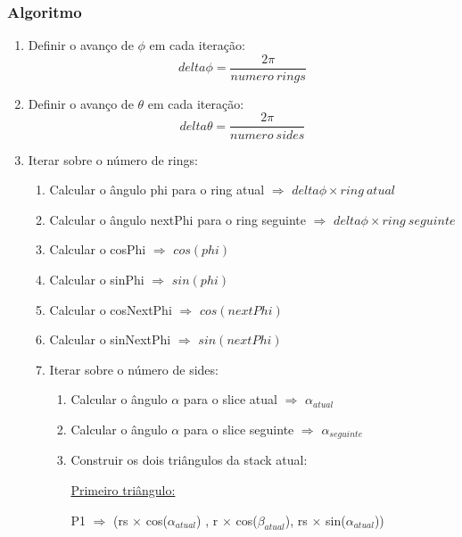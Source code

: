 \documentclass[a4paper]{article}
\begin{document}
 \subsubsection{Algoritmo}
 
 \ttfamily
\begin{enumerate}
  \item Definir o avanço de $\phi$ em cada iteração: $$delta\phi = \frac{2\pi}{numero\ rings} $$
  \item Definir o avanço de $\theta$ em cada iteração: $$delta\theta = \frac{2\pi}{numero\ sides} $$
  
  \item Iterar sobre o número de rings:
  \begin{enumerate}
    \item Calcular o ângulo phi para o ring atual $\Rightarrow$ \underline{$delta\phi \times ring\ atual$}
    \item Calcular o ângulo nextPhi para o ring seguinte $\Rightarrow$ \underline{$delta\phi \times ring\ seguinte$}
    \item Calcular o cosPhi $\Rightarrow$ \underline{$cos(phi)$}
    \item Calcular o sinPhi $\Rightarrow$ \underline{$sin(phi)$}
    \item Calcular o cosNextPhi $\Rightarrow$ \underline{$cos(nextPhi)$}
    \item Calcular o sinNextPhi $\Rightarrow$ \underline{$sin(nextPhi)$}

    \item Iterar sobre o número de sides:
    \begin{enumerate}
      \item Calcular o ângulo $\alpha$ para o slice atual $\Rightarrow$ \underline{$\alpha_{atual}$}
      \item Calcular o ângulo $\alpha$ para o slice seguinte $\Rightarrow$ \underline{$\alpha_{seguinte}$}
      \item Construir os dois triângulos da stack atual:

      \vspace{0.5cm}

      \underline{Primeiro triângulo:}

      \vspace{0.5cm}

          \hspace{0.0cm} P1 $\Rightarrow$ (rs $\times$ cos($\alpha_{atual}$) , r $\times$ cos($\beta_{atual}$), rs $\times$ sin($\alpha_{atual}$))


\end{enumerate}
\end{enumerate}
\end{enumerate}
\end{document}
